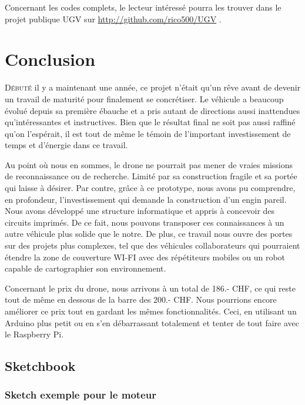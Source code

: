\documentclass[a4paper,11pt]{report}
\begin{document}
{Concernant les codes complets, le lecteur intéressé pourra les trouver dans le projet publique UGV sur \url{http://github.com/rico500/UGV} .

\chapter{Conclusion}

\lettrine{D}{ébuté} il y a maintenant une année, ce projet n'était qu'un rêve avant de devenir un travail de maturité pour finalement se concrétiser. Le véhicule a beaucoup évolué depuis sa première ébauche et a pris autant de directions aussi inattendues qu'intéressantes et instructives. Bien que le résultat final ne soit pas aussi raffiné qu'on l'espérait, il est tout de même le témoin de l'important investissement de temps et d'énergie dans ce travail.

Au point où nous en sommes, le drone ne pourrait pas mener de vraies missions de reconnaissance ou de recherche. Limité par sa construction fragile et sa portée qui laisse à désirer. Par contre, grâce à ce prototype, nous avons pu comprendre, en profondeur, l'investissement qui demande la construction d'un engin pareil. Nous avons développé une structure informatique et appris à concevoir des circuits imprimés. De ce fait, nous pouvons transposer ces connaissances à un autre véhicule plus solide que le notre. De plus, ce travail nous ouvre des portes sur des projets plus complexes, tel que des véhicules collaborateurs qui pourraient étendre la zone de couverture WI-FI avec des répétiteurs mobiles ou un robot capable de cartographier son environnement.

Concernant le prix du drone, nous arrivons à un total de 186.- CHF, ce qui reste tout de même en dessous de la barre des 200.- CHF. Nous pourrions encore améliorer ce prix tout en gardant les mêmes fonctionnalités. Ceci, en utilisant un Arduino plus petit ou en s'en débarrassant totalement et tenter de tout faire avec le Raspberry Pi. 

\clearpage

\appendix

\section{Sketchbook}

\subsection{Sketch exemple pour le moteur}


}
\end{document}
